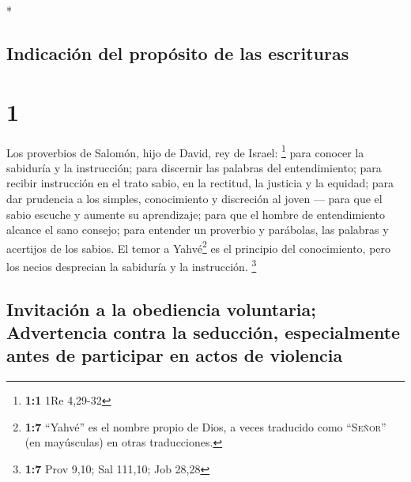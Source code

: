 \begin{paracol}{2} \switchcolumn[0]*

\hypertarget{indicaciuxf3n-del-propuxf3sito-de-las-escrituras}{%
\subsection{Indicación del propósito de las
escrituras}\label{indicaciuxf3n-del-propuxf3sito-de-las-escrituras}}

\hypertarget{section}{%
\section{1}\label{section}}

 Los proverbios de Salomón, hijo de David, rey de Israel:
\footnote{\textbf{1:1} 1Re 4,29-32}  para conocer la
sabiduría y la instrucción; para discernir las palabras del
entendimiento;  para recibir instrucción en el trato
sabio, en la rectitud, la justicia y la equidad;  para dar
prudencia a los simples, conocimiento y discreción al joven ---
 para que el sabio escuche y aumente su aprendizaje; para
que el hombre de entendimiento alcance el sano consejo; 
para entender un proverbio y parábolas, las palabras y acertijos de los
sabios.  El temor a Yahvé\footnote{\textbf{1:7} ``Yahvé''
  es el nombre propio de Dios, a veces traducido como ``\textsc{Señor}''
  (en mayúsculas) en otras traducciones.} es el principio del
conocimiento, pero los necios desprecian la sabiduría y la instrucción.
\footnote{\textbf{1:7} Prov 9,10; Sal 111,10; Job 28,28}

\hypertarget{invitaciuxf3n-a-la-obediencia-voluntaria-advertencia-contra-la-seducciuxf3n-especialmente-antes-de-participar-en-actos-de-violencia}{%
\subsection{Invitación a la obediencia voluntaria; Advertencia contra la
seducción, especialmente antes de participar en actos de
violencia}\label{invitaciuxf3n-a-la-obediencia-voluntaria-advertencia-contra-la-seducciuxf3n-especialmente-antes-de-participar-en-actos-de-violencia}}


\end{paracol}
